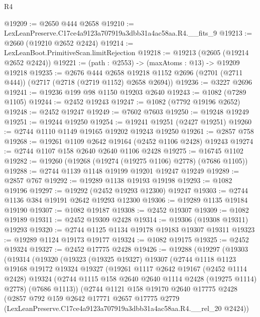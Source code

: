 \begin{lexlean}{R4}
\begin{coremodule}
@19209 := @2650 @444 @2658
@19210 := LexLeanPreserve.C17ce4a9123a707919a3dbb31a4ac58aa.R4.__fits_9
@19213 := @2660 (@19210 @2652 @2424)
@19214 := LexLeanBoot.PrimitiveScan.limitRejection
@19218 := @19213 (@2605 (@19214 @2652 @2424))
@19221 := (path : @2553) -> (maxAtoms : @13) -> @19209 @19218
@19235 := @2676
    @444
    @2658
    @19218
    @1152
    @2696
    (@2701 (@2711 @444))
    (@2717 (@2718 (@2719 @1152) @2658 @2694))
@19236 := @3227 @2696
@19241 := @19236 @199 @98 @1150 @19203 @2640
@19243 := @1082 (@7289 @1105)
@19244 := @2452 @19243
@19247 := @1082 (@7792 @19196 @2652)
@19248 := @2452 @19247
@19249 := @7602 @7603
@19250 := @19248 @19249
@19251 := @19244 @19250
@19254 := @19241 @19251 (@2427 @19251)
@19260 := @2744 @1110 @1149 @19165 @19202 @19243 @19250
@19261 := @2857 @758
@19268 := @19261 @1109 @2642 @19164 (@2452 @1106 @2428) @19243
@19274 := @2744 @1107 @158 @2640 @2640 @1106 @2428
@19275 := @16745 @1102
@19282 := @19260 (@19268 (@19274 (@19275 @1106) @2778) (@7686 @1105))
@19288 := @2744 @1139 @1148 @19199 @19201 @19247 @19249
@19289 := @2857 @767
@19292 := @19289 @1138 @19193 @19198
@19293 := @1082 @19196
@19297 := @19292 (@2452 @19293 @12300) @19247
@19303 := @2744 @1136 @384 @19191 @2642 @19293 @12300
@19306 := @19289 @1135 @19184 @19190
@19307 := @1082 @19187
@19308 := @2452 @19307
@19309 := @1082 @19189
@19311 := @2452 @19309 @2428
@19314 := @19306 (@19308 @19311) @19293
@19320 := @2744 @1125 @1134 @19178 @19183 @19307 @19311
@19323 := @19289 @1124 @19173 @19177
@19324 := @1082 @19175
@19325 := @2452 @19324
@19327 := @2452 @17775 @2428
@19426 := @19288
    (@19297
      (@19303
        (@19314
          (@19320
            (@19323
              (@19325 @19327)
              @19307
              (@2744
                @1118
                @1123
                @19168
                @19172
                @19324
                @19327
                (@19261
                  @1117
                  @2642
                  @19167
                  (@2452 @1114 @2428)
                  @19324
                  (@2744 @1115 @158 @2640 @2640 @1114 @2428 (@19275 @1114) @2778)
                  (@7686 @1113))
                (@2744
                  @1121
                  @158
                  @19170
                  @2640
                  @17775
                  @2428
                  (@2857
                    @792
                    @159
                    @2642
                    @17771
                    @2657
                    @17775
                    @2779
                    (LexLeanPreserve.C17ce4a9123a707919a3dbb31a4ac58aa.R4.__rel_20 @2424))

\end{coremodule}
\end{lexlean}
